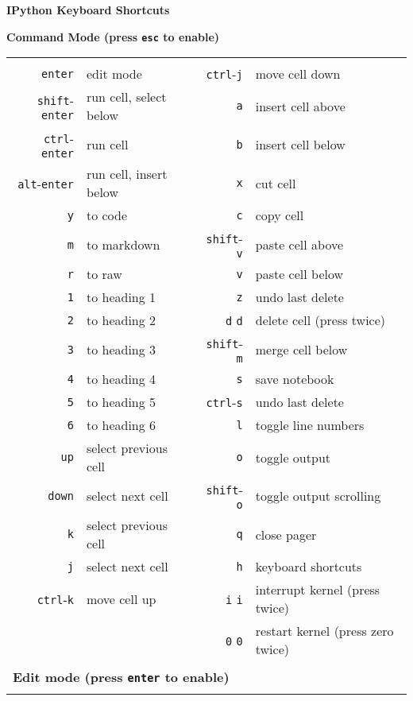 \documentclass[letterpaper,12pt,oneside]{article}
\begin{document}
% 
\begin{center}
\textbf{\large IPython Keyboard Shortcuts}
\end{center}

\textbf{Command Mode (press {\tt esc} to enable)}

\begin{tabular}{rlrl}
&&&\\
{\tt enter} &edit mode & {\tt ctrl}-{\tt j} & move cell down\\     
{\tt shift}-{\tt enter} & run cell, select below & {\tt a} & insert cell above \\
{\tt ctrl}-{\tt enter} & run cell & {\tt b} & insert cell below \\
{\tt alt}-{\tt enter}& run cell, insert below & {\tt x} & cut cell \\
{\tt y} & to code& {\tt c} & copy cell \\
{\tt m} & to markdown & {\tt shift}-{\tt v} & paste cell above  \\
{\tt r} & to raw & {\tt v} & paste cell below\\
{\tt 1} & to heading 1 & {\tt z} & undo last delete \\
{\tt 2} & to heading 2 & {\tt d} {\tt d} & delete cell (press twice) \\
{\tt 3} & to heading 3 & {\tt shift}-{\tt m} & merge cell below \\
{\tt 4} & to heading 4 & {\tt s} & save notebook \\
{\tt 5} & to heading 5 & {\tt ctrl}-{\tt s} & undo last delete \\
{\tt 6} & to heading 6 & {\tt l} & toggle line numbers \\
{\tt up} & select previous cell & {\tt o} & toggle output \\
{\tt down} & select next cell & {\tt shift}-{\tt o} & toggle output scrolling \\
{\tt k} & select previous cell & {\tt q} & close pager \\
{\tt j} & select next cell & {\tt h} & keyboard shortcuts \\
 {\tt ctrl}-{\tt k} & move cell up& {\tt i} {\tt i} & interrupt kernel (press twice) \\
 & & {\tt 0} {\tt 0} & restart kernel (press zero twice) \\   

&&&\\
\multicolumn{4}{l}{\textbf{Edit mode (press {\tt enter} to enable)}} \\
&&&\\


\end{tabular}
\end{document}
